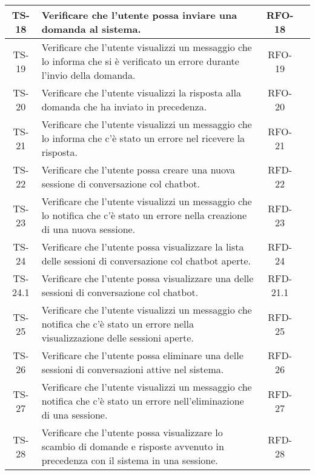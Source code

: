 \begin{xltabular}{\textwidth}{| c | X | c | c |}
    \hline
    TS-18 &  Verificare che l'utente possa inviare una domanda al sistema. & RFO-18 & \textcolor{xmarkcolor}{} \\
    \hline
    TS-19 & Verificare che l'utente visualizzi un messaggio che lo informa che si è verificato un errore durante l'invio della domanda. & RFO-19 & \textcolor{xmarkcolor}{} \\
    \hline
    TS-20 & Verificare che l’utente visualizzi la risposta alla domanda che ha inviato in precedenza. & RFO-20 & \textcolor{xmarkcolor}{} \\
    \hline
    TS-21 & Verificare che l'utente visualizzi un messaggio che lo informa che c'è stato un errore nel ricevere la risposta. & RFO-21 & \textcolor{xmarkcolor}{} \\
    \hline
    TS-22 & Verificare che l'utente possa creare una nuova sessione di conversazione col chatbot. & RFD-22 & \textcolor{xmarkcolor}{} \\
    \hline
    TS-23 & Verificare che l'utente visualizzi un messaggio che lo notifica che c'è stato un errore nella creazione di una nuova sessione. & RFD-23 & \textcolor{xmarkcolor}{} \\
    \hline
    TS-24 & Verificare che l'utente possa visualizzare la lista delle sessioni di conversazione col chatbot aperte. & RFD-24 & \textcolor{xmarkcolor}{} \\
    \hline
    TS-24.1 & Verificare che l'utente possa visualizzare una delle sessioni di conversazione col chatbot. & RFD-21.1 & \textcolor{xmarkcolor}{} \\
    \hline
    TS-25 & Verificare che l'utente visualizzi un messaggio che notifica che c'è stato un errore nella visualizzazione delle sessioni aperte. & RFD-25 & \textcolor{xmarkcolor}{} \\
    \hline
    TS-26 & Verificare che l'utente possa eliminare una delle sessioni di conversazioni attive nel sistema. & RFD-26 & \textcolor{xmarkcolor}{} \\
    \hline
    TS-27 & Verificare che l'utente visualizzi un messaggio che notifica che c'è stato un errore nell'eliminazione di una sessione. & RFD-27 & \textcolor{xmarkcolor}{} \\
    \hline
    TS-28 & Verificare che l'utente possa visualizzare lo scambio di domande e risposte avvenuto in precedenza con il sistema in una sessione. & RFD-28 & \textcolor{xmarkcolor}{} \\

\end{xltabular}
